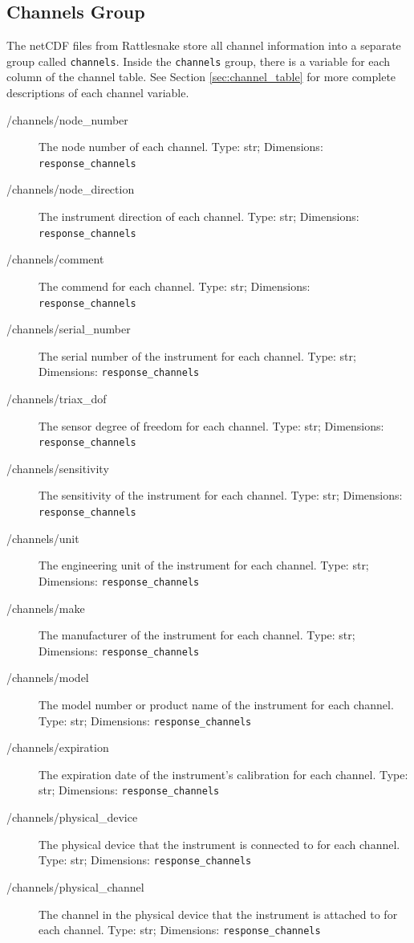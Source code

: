 \documentclass[pdf,12pt,report]{SANDreport}
\newcommand{\inlineCode}{\lstinline[basicstyle=\bfseries\ttfamily]}
\begin{document}
    \subsection{Channels Group}
    The netCDF files from Rattlesnake store all channel information into a separate group called \inlineCode{channels}.  Inside the \inlineCode{channels} group, there is a variable for each column of the channel table.  See Section \ref{sec:channel_table} for more complete descriptions of each channel variable.
    \begin{description}
        \item[/channels/node\_number] The node number of each channel.  Type: str; Dimensions: \inlineCode{response_channels}
        \item[/channels/node\_direction] The instrument direction of each channel.  Type: str; Dimensions: \inlineCode{response_channels}
        \item[/channels/comment] The commend for each channel.  Type: str; Dimensions: \inlineCode{response_channels}
        \item[/channels/serial\_number] The serial number of the instrument for each channel.  Type: str; Dimensions: \inlineCode{response_channels}
        \item[/channels/triax\_dof] The sensor degree of freedom for each channel.  Type: str; Dimensions: \inlineCode{response_channels}
        \item[/channels/sensitivity] The sensitivity of the instrument for each channel.  Type: str; Dimensions: \inlineCode{response_channels}
        \item[/channels/unit] The engineering unit of the instrument for each channel. Type: str; Dimensions: \inlineCode{response_channels}
        \item[/channels/make] The manufacturer of the instrument for each channel.  Type: str; Dimensions: \inlineCode{response_channels}
        \item[/channels/model] The model number or product name of the instrument for each channel.  Type: str; Dimensions: \inlineCode{response_channels}
        \item[/channels/expiration] The expiration date of the instrument's calibration for each channel.  Type: str; Dimensions: \inlineCode{response_channels}
        \item[/channels/physical\_device] The physical device that the instrument is connected to for each channel.  Type: str; Dimensions: \inlineCode{response_channels}
        \item[/channels/physical\_channel] The channel in the physical device that the instrument is attached to for each channel.  Type: str; Dimensions: \inlineCode{response_channels}

\end{description}
\end{document}
